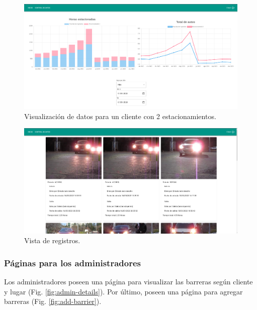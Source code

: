 \begin{figure}
    \centering
    \includegraphics[width=\textwidth]{imgs/server/resume.png}
    \caption{Visualización de datos para un cliente con 2 estacionamientos.}
    \label{fig:dashboard}
\end{figure}

\begin{figure}
    \centering
    \includegraphics[width=\textwidth]{imgs/server/registers.png}
    \caption{Vista de registros.}
    \label{fig:registers}
\end{figure}



\subsubsection*{Páginas para los administradores}

Los administradores poseen una página para visualizar las barreras según cliente y lugar (Fig. \ref{fig:admin-details}). Por último, poseen una página para agregar barreras (Fig. \ref{fig:add-barrier}).

